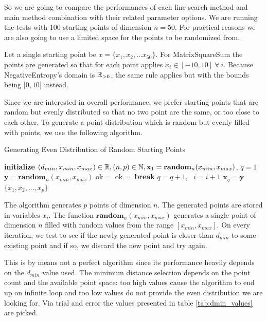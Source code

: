 \documentclass[a4paper,english,titlepage,12pt]{article}
\newcommand{\vect}[1]{\ensuremath{\mathbf{#1}}}
\newcommand{\norm}[1]{\ensuremath\Vert #1 \Vert}
\newcommand{\R}{\ensuremath\mathbb{R}}
\newcommand{\N}{\ensuremath\mathbb{N}}
\begin{document}
So we are going to compare the performances of each line search method and main method combination with their related parameter options. We are running the tests with 100 starting points of dimension $n = 50$. For practical reasons we are also going to use a limited space for the points to be randomized from.

Let a single starting point be $x = \{x_1, x_2, \dots x_{50}\}$. For MatrixSquareSum the points are generated so that for each point applies $x_i \in  [-10, 10]\ \forall\ i$. Because NegativeEntropy's domain is $\R_{>0}$, the same rule applies but with the bounds being $]0, 10]$ instead.

Since we are interested in overall performance, we prefer starting points that are random but evenly distributed so that no two point are the same, or too close to each other. To generate a point distribution which is random but evenly filled with points, we use the following algorithm.

\begin{algorithm}[H]
\caption{Generating Even Distribution of Random Starting Points}
\label{alg_x0_distribution}
\begin{algorithmic}[1]
\STATE \textbf{initialize} $(d_{min}, x_{min}, x_{max}) \in \R, (n, p) \in \N, \vect{x}_1 = \mathbf{random}_{n}(x_{min}, x_{max})$, $q = 1$
    \STATE $\vect{y} = \mathbf{random}_{n}(x_{min}, x_{max})$
    \STATE $\mathrm{ok} =$ \TRUE
        \IF{$\norm{\vect{x}_j - \vect{y}} < d_{min}$}
            \STATE $\mathrm{ok} = $ \FALSE
            \STATE \textbf{break}
        \ENDIF
    \ENDFOR
        \STATE $q = q + 1$, \ $i = i + 1$
        \STATE $\vect{x}_q = \vect{y}$
    \ENDIF
\ENDWHILE
\RETURN $\{ x_1, x_2, ..., x_p\}$
\end{algorithmic}
\end{algorithm}

The algorithm generates $p$ points of dimension $n$. The generated points are stored in variables $x_i$. The function $\mathbf{random}_n(x_{min}, x_{max})$ generates a single point of dimension $n$ filled with random values from the range $[x_{min}, x_{max}]$. On every iteration, we test to see if the newly generated point is closer than $d_{min}$ to some existing point and if so, we discard the new point and try again.

This is by means not a perfect algorithm since its performance heavily depends on the $d_{min}$ value used. The minimum distance selection depends on the point count and the available point space: too high values cause the algorithm to end up on infinite loop and too low values do not provide the even distribution we are looking for. Via trial and error the values presented in table \ref{tab:dmin_values} are picked.
\end{document}

